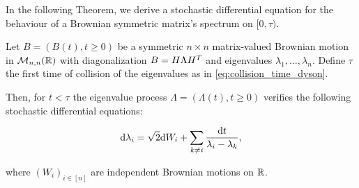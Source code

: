 In the following Theorem, we derive a stochastic differential equation for the behaviour of a Brownian symmetric matrix's spectrum on $[0,\tau)$.

\begin{theorem} \label{thm:dyson_real}
    Let $B = (B(t), t \ge 0)$ be a symmetric $n\times n$ matrix-valued Brownian motion in $\mathcal M_{n,n}(\mathbb R)$ with diagonalization $B = H \Lambda H^T$ and eigenvalues $\lambda_1, \dots, \lambda_n$. Define $\tau$ the first time of collision of the eigenvalues as in \eqref{eq:collision_time_dyson}.
    
    Then, for $t < \tau$ the eigenvalue process $\Lambda = (\Lambda(t), t\ge 0)$ verifies the following stochastic differential equations:

    \begin{equation}
        \mathrm d \lambda_i = \sqrt{2}\mathrm d W_i + \sum_{k\neq i} \frac{\mathrm d t}{\lambda_i - \lambda_k}, 
    \end{equation}

    \noindent where $(W_i)_{i\in[n]}$ are independent Brownian motions on $\mathbb R$.
\end{theorem}

